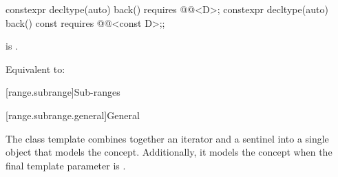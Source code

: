%
\begin{itemdecl}
constexpr decltype(auto) back() requires @@<D>;
constexpr decltype(auto) back() const requires @@<const D>;;
\end{itemdecl}

\begin{itemdescr}
\pnum
\expects
{} is .

\pnum
\effects
Equivalent to: 
\end{itemdescr}

[range.subrange]{Sub-ranges}

[range.subrange.general]{General}

\pnum
The  class template combines together an
iterator and a sentinel into a single object that models the
 concept. Additionally, it models the
 concept when the final template parameter is
.


